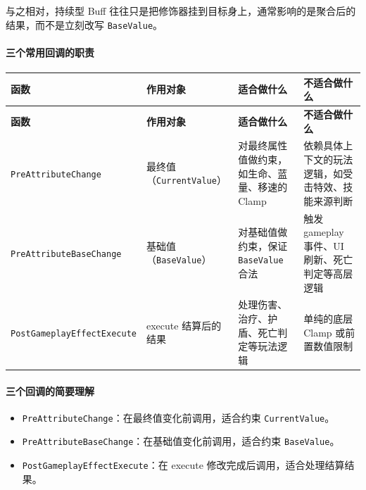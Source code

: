 与之相对，持续型 Buff 往往只是把修饰器挂到目标身上，通常影响的是聚合后的结果，而不是立刻改写 \texttt{BaseValue}。

\paragraph{三个常用回调的职责}
\begin{center}
	\footnotesize
	
	\renewcommand{\arraystretch}{1.15}
	
	\begin{longtable}{|p{4cm}|p{2cm}|p{4.2cm}|p{4.2cm}|}
		\hline
		\textbf{函数} & \textbf{作用对象} & \textbf{适合做什么} & \textbf{不适合做什么} \\
		\hline
		\endfirsthead
		
		\hline
		\textbf{函数} & \textbf{作用对象} & \textbf{适合做什么} & \textbf{不适合做什么} \\
		\hline
		\endhead
		
		\hline
		\endfoot
		
		\hline
		\endlastfoot
		
		\texttt{PreAttributeChange}
		& 最终值（\texttt{CurrentValue}）
		& 对最终属性值做约束，如生命、蓝量、移速的 Clamp
		& 依赖具体上下文的玩法逻辑，如受击特效、技能来源判断 \\
		\hline
		
		\texttt{PreAttributeBaseChange}
		& 基础值（\texttt{BaseValue}）
		& 对基础值做约束，保证 \texttt{BaseValue} 合法
		& 触发 gameplay 事件、UI 刷新、死亡判定等高层逻辑 \\
		\hline
		
		\texttt{PostGameplayEffectExecute}
		& execute 结算后的结果
		& 处理伤害、治疗、护盾、死亡判定等玩法逻辑
		& 单纯的底层 Clamp 或前置数值限制 \\
		\hline
		
	\end{longtable}
\end{center}

\paragraph{三个回调的简要理解}
\begin{itemize}
	\item \texttt{PreAttributeChange}：在最终值变化前调用，适合约束 \texttt{CurrentValue}。
	\item \texttt{PreAttributeBaseChange}：在基础值变化前调用，适合约束 \texttt{BaseValue}。
	\item \texttt{PostGameplayEffectExecute}：在 execute 修改完成后调用，适合处理结算结果。
\end{itemize}

